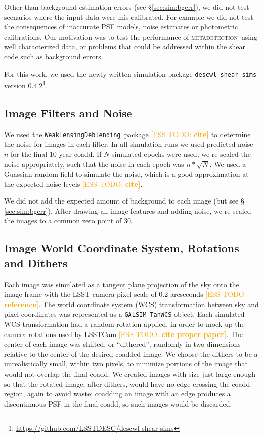 \documentclass[twocolumn,twocolappendix,astrosym]{openjournal}
\newcommand{\esstodo}[1]{\textcolor{orange}{[ESS TODO: \bf #1]}}
\newcommand{\descwl}{\texttt{WeakLensingDeblending}}
\newcommand{\galsim}{\texttt{GALSIM}}
\newcommand{\mdet}{\textsc{metadetection}}
\begin{document}
Other than background estimation errors (see \S \ref{sec:sim:bgerr}), we did not
test scenarios where the input data were mis-calibrated.  For example we did
not test the consequences of inaccurate PSF models, noise estimates or
photometric calibrations.  Our motivation was to test the performance of \mdet\
using well characterized data, or problems that could be addressed within
the shear code such as background errors.

For this work, we used the newly written simulation package
\texttt{descwl-shear-sims} version
0.4.2\footnote{\url{https://github.com/LSSTDESC/descwl-shear-sims}}.

\subsection{Image Filters and Noise} \label{sec:sim:noise}

We used the \descwl\ package \esstodo{cite} to determine the noise for images
in each filter.  In all simulation runs we used predicted noise $n$ for the
final 10 year coadd.  If $N$ simulated epochs were used, we re-scaled the noise
appropriately, such that the noise in each epoch was $n * \sqrt{N}$.  We used a
Guassian random field to simulate the noise, which is a good approximation at
the expected noise levels \esstodo{cite}.

We did not add the expected amount of background to each image (but see \S
\ref{sec:sim:bgerr}).  After drawing all image features and adding
noise, we re-scaled the images to a common zero point of 30.

\subsection{Image World Coordinate System, Rotations and Dithers} \label{sec:sim:rotdith}

Each image was simulated as a tangent plane projection of the sky onto the
image frame with the LSST camera pixel scale of 0.2 arcseconds \esstodo{reference}.
The world coordinate system (WCS) transformation between sky and pixel
coordinates was represented as a \galsim\ \texttt{TanWCS} object.  Each
simulated WCS transformation had a random rotation applied, in order to mock up
the camera rotations used by LSSTCam \esstodo{cite proper paper}.  The center of
each image was shifted, or ``dithered'', randomly in two dimensions relative to
the center of the desired coadded image.  We choose the dithers to be a
unrealistically small, within two pixels, to minimize portions of the image
that would not overlap the final coadd.  We created images with size just large enough
so that the rotated image, after dithers, would have no edge crossing the coadd
region, again to avoid waste:  coadding an image with an edge produces a
discontinuous PSF in the final coadd, so such images would be discarded.
\end{document}

